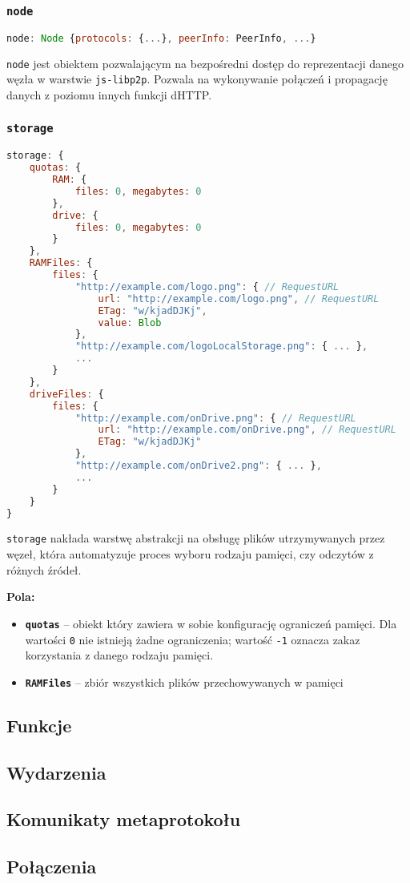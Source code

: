 % 

\subsubsection{\texttt{node}}
\begin{lstlisting}[language=javascript]
    node: Node {protocols: {...}, peerInfo: PeerInfo, ...}
\end{lstlisting}
\texttt{node} jest obiektem pozwalającym na bezpośredni dostęp do reprezentacji danego węzła w warstwie \texttt{js-libp2p}. Pozwala na wykonywanie połączeń i propagację danych z poziomu innych funkcji dHTTP.

% 

\subsubsection{\texttt{storage}}
\begin{lstlisting}[language=javascript]
storage: {
    quotas: {
        RAM: {
            files: 0, megabytes: 0
        },
        drive: {
            files: 0, megabytes: 0
        }
    },
    RAMFiles: {
        files: {
            "http://example.com/logo.png": { // RequestURL
                url: "http://example.com/logo.png", // RequestURL
                ETag: "w/kjadDJKj",
                value: Blob
            },
            "http://example.com/logoLocalStorage.png": { ... },
            ...
        }
    },
    driveFiles: {
        files: {
            "http://example.com/onDrive.png": { // RequestURL
                url: "http://example.com/onDrive.png", // RequestURL
                ETag: "w/kjadDJKj"
            },
            "http://example.com/onDrive2.png": { ... },
            ...
        }
    }
}
\end{lstlisting}
\texttt{storage} nakłada warstwę abstrakcji na obsługę plików utrzymywanych przez węzeł, która automatyzuje proces wyboru rodzaju pamięci, czy odczytów z różnych źródeł.

\textbf{Pola:}
\begin{itemize}
    \item \textbf{\texttt{quotas}} -- obiekt który zawiera w sobie konfigurację ograniczeń pamięci. Dla wartości \texttt{0} nie istnieją żadne ograniczenia; wartość \texttt{-1} oznacza zakaz korzystania z danego rodzaju pamięci.
    \item \textbf{\texttt{RAMFiles}} -- zbiór wszystkich plików przechowywanych w pamięci 
\end{itemize}


\subsection{Funkcje}
\label{sub:functions}

\subsection{Wydarzenia}
\subsection{Komunikaty metaprotokołu}
\subsection{Połączenia}
